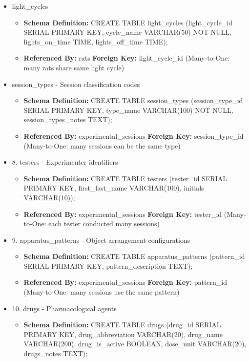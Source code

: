 \documentclass[12pt, titlepage]{article}
\begin{document}
\begin{itemize}
\item light\_cycles
\begin{itemize}
	\item{\textbf{Schema Definition: }CREATE TABLE light\_cycles (light\_cycle\_id SERIAL PRIMARY KEY, cycle\_name VARCHAR(50) NOT NULL, lights\_on\_time TIME, lights\_off\_time TIME);}
	\item{\textbf{Referenced By: }rats \textbf{Foreign Key: }light\_cycle\_id (Many-to-One: many rats share same light cycle)}
\end{itemize}
\item session\_types - Session classification codes
\begin{itemize}
	\item{\textbf{Schema Definition: }CREATE TABLE session\_types (session\_type\_id SERIAL PRIMARY KEY, type\_name VARCHAR(100) NOT NULL, session\_types\_notes TEXT);}
	\item{\textbf{Referenced By: }experimental\_sessions \textbf{Foreign Key: }session\_type\_id (Many-to-One: many sessions can be the same type)}
\end{itemize}
\item 8. testers - Experimenter identifiers
\begin{itemize}
	\item{\textbf{Schema Definition: }CREATE TABLE testers (tester\_id SERIAL PRIMARY KEY, first\_last\_name VARCHAR(100), initials VARCHAR(10));}
	\item{\textbf{Referenced By: }experimental\_sessions \textbf{Foreign Key: }tester\_id (Many-to-One: each tester conducted many sessions)}
\end{itemize}
\item 9. apparatus\_patterns - Object arrangement configurations
\begin{itemize}
	\item{\textbf{Schema Definition: }CREATE TABLE apparatus\_patterns (pattern\_id SERIAL PRIMARY KEY, pattern\_description TEXT);}
	\item{\textbf{Referenced By: }experimental\_sessions \textbf{Foreign Key: }pattern\_id (Many-to-One: many sessions use the same pattern)}
\end{itemize}
\item 10. drugs - Pharmacological agents
\begin{itemize}
	\item{\textbf{Schema Definition: }CREATE TABLE drugs (drug\_id SERIAL PRIMARY KEY, drug\_abbreviation VARCHAR(20), drug\_name
	      VARCHAR(200), drug\_is\_active BOOLEAN, dose\_unit VARCHAR(20), drugs\_notes TEXT);}

\end{itemize}
\end{itemize}
\end{document}
